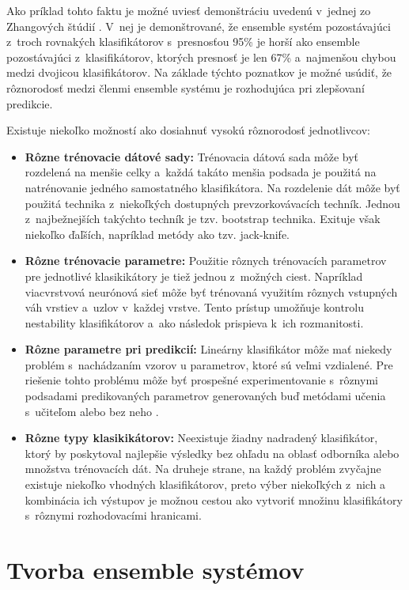 Ako príklad tohto faktu je možné uviesť demonštráciu uvedenú v~jednej zo Zhangových štúdií \cite{zhang}. V~nej je demonštrované, že ensemble systém pozostávajúci z~troch rovnakých klasifikátorov s~presnosťou 95\% je horší ako ensemble pozostávajúci z~klasifikátorov, ktorých presnosť je len 67\% a~najmenšou chybou medzi dvojicou klasifikátorov. Na základe týchto poznatkov je možné usúdiť, že rôznorodosť medzi členmi ensemble systému je rozhodujúca pri zlepšovaní predikcie.

Existuje niekoľko možností ako dosiahnuť vysokú rôznorodosť jednotlivcov:
\begin{itemize}
	\item \textbf{Rôzne trénovacie dátové sady:} Trénovacia dátová sada môže byť rozdelená na menšie celky a~každá takáto menšia podsada je použitá na natrénovanie jedného samostatného klasifikátora. Na rozdelenie dát môže byť použitá technika z~niekoľkých dostupných prevzorkovávacích techník. Jednou z~najbežnejších takýchto techník je tzv. bootstrap technika. Exituje však niekoľko ďaľších, napríklad metódy ako tzv. jack-knife.
	\item \textbf{Rôzne trénovacie parametre:} Použitie rôznych trénovacích parametrov pre jednotlivé klasikikátory je tiež jednou z~možných ciest. Napríklad viacvrstvová neurónová sieť môže byť trénovaná využitím rôznych vstupných váh vrstiev a~uzlov v~každej vrstve. Tento prístup umožňuje kontrolu nestability klasifikátorov a~ako následok prispieva k~ich rozmanitosti. 	
	\item \textbf{Rôzne parametre pri predikcií:} Lineárny klasifikátor môže mať niekedy problém s~nachádzaním vzorov u parametrov, ktoré sú veľmi vzdialené. Pre riešenie tohto problému môže byť prospešné experimentovanie s~rôznymi podsadami predikovaných parametrov generovaných buď metódami učenia s~učiteľom alebo bez neho \cite{dataclass}.	
	\item \textbf{Rôzne typy klasikikátorov:} Neexistuje žiadny nadradený klasifikátor, ktorý by poskytoval najlepšie výsledky bez ohľadu na oblasť odborníka alebo množstva trénovacích dát. Na druheje strane, na každý problém zvyčajne existuje niekoľko vhodných klasifikátorov, preto výber niekoľkých z~nich a kombinácia ich výstupov je možnou cestou ako vytvoriť množinu klasifikátory s~rôznymi rozhodovacími hranicami.
\end{itemize}

\newpage
\section{Tvorba ensemble systémov}

